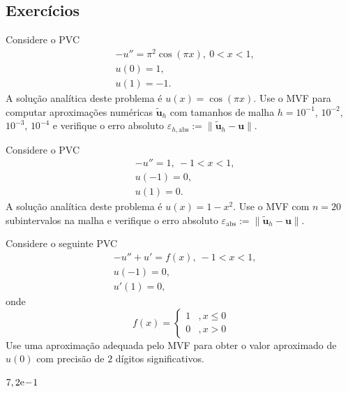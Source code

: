\subsection{Exercícios}

\begin{exer}
  Considere o PVC
  \begin{align}
    &-u'' = \pi^2\cos(\pi x), ~0 < x < 1,\\
    &u(0) = 1,\\
    &u(1) = -1.
  \end{align}
  A solução analítica deste problema é $u(x) = \cos(\pi x)$. Use o MVF para computar aproximações numéricas $\tilde{\pmb{u}}_h$ com tamanhos de malha $h = 10^{-1}$, $10^{-2}$, $10^{-3}$, $10^{-4}$ e verifique o erro absoluto $\varepsilon_{h,\text{abs}} := \|\tilde{\pmb{u}}_h - \pmb{u}\|$.
\end{exer}

\begin{exer}
  Considere o PVC
  \begin{align}
    &-u'' = 1, ~-1 < x < 1,\\
    &u(-1) = 0,\\
    &u(1) = 0.
  \end{align}
  A solução analítica deste problema é $u(x) = 1-x^2$. Use o MVF com $n=20$ subintervalos na malha e verifique o erro absoluto $\varepsilon_{\text{abs}} := \|\tilde{\pmb{u}}_h - \pmb{u}\|$.
\end{exer}

\begin{exer}
Considere o seguinte PVC
\begin{subequations}
  \begin{align}
    &-u'' + u' = f(x), ~-1 < x < 1,\\
    &u(-1) = 0,\\
    &u'(1) =0,
  \end{align}
\end{subequations}
onde
\begin{equation}
  f(x) = \left\{
    \begin{array}{ll}
      1 &, x\leq 0\\
      0 &, x>0
    \end{array}
  \right.
\end{equation}
Use uma aproximação adequada pelo MVF para obter o valor aproximado de $u(0)$ com precisão de $2$ dígitos significativos.
\end{exer}
\begin{resp}
  $7,2\mathrm{e}\!-\!1$
\end{resp}

